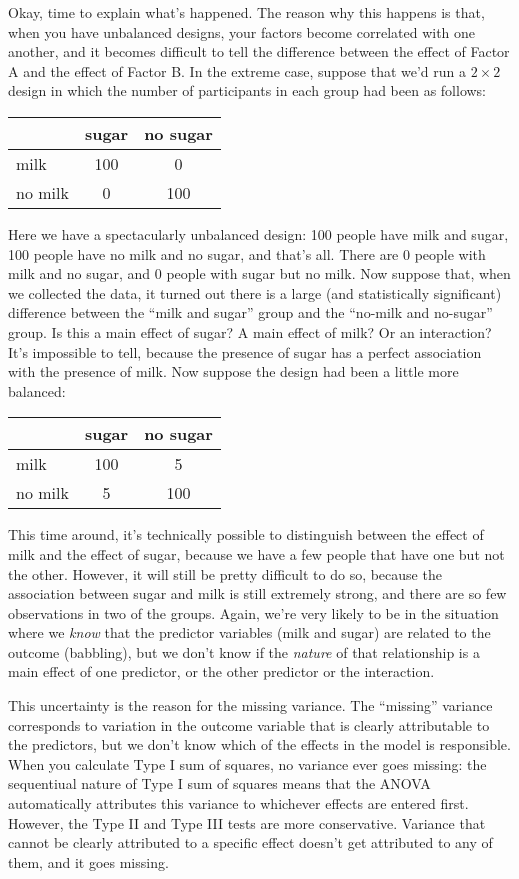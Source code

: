 Okay, time to explain what's happened. The reason why this happens is that, when you have unbalanced designs, your factors become correlated with one another, and it becomes difficult to tell the difference between the effect of Factor A and the effect of Factor B. In the extreme case, suppose that we'd run a $2 \times 2$ design in which the number of participants in each group had been as follows:
\begin{center}
\begin{tabular}{l|cc}
& sugar & no sugar \\ \hline
milk & 100 & 0 \\
no milk & 0& 100 \\
\end{tabular}
\end{center}
Here we have a spectacularly unbalanced design: 100 people have milk and sugar, 100 people have no milk and no sugar, and that's all. There are 0 people with milk and no sugar, and 0 people with sugar but no milk. Now suppose that, when we collected the data, it turned out there is a large (and statistically significant) difference between the ``milk and sugar'' group and the ``no-milk and no-sugar'' group. Is this a main effect of sugar? A main effect of milk? Or an interaction? It's impossible to tell, because the presence of sugar has a perfect association with the presence of milk. Now suppose the design had been a little more balanced:
\begin{center}
\begin{tabular}{l|cc}
& sugar & no sugar \\ \hline
milk & 100 & 5 \\
no milk & 5 & 100 \\
\end{tabular}
\end{center}
This time around, it's technically possible to distinguish between the effect of milk and the effect of sugar, because we have a few people that have one but not the other. However, it will still be pretty difficult to do so, because the association between sugar and milk is still extremely strong, and there are so few observations in two of the groups. Again, we're very likely to be in the situation where we {\it know} that the predictor variables (milk and sugar) are related to the outcome (babbling), but we don't know if the {\it nature} of that relationship is a main effect of one predictor, or the other predictor or the interaction. 

This uncertainty is the reason for the missing variance. The ``missing'' variance corresponds to variation in the outcome variable that is clearly attributable to the predictors, but we don't know which of the effects in the model is responsible. When you calculate Type I sum of squares, no variance ever goes missing: the sequentiual nature of Type I sum of squares means that the ANOVA automatically attributes this variance to whichever effects are entered first. However, the Type II and Type III tests are more conservative. Variance that cannot be clearly attributed to a specific effect doesn't get attributed to any of them, and it goes missing. 




